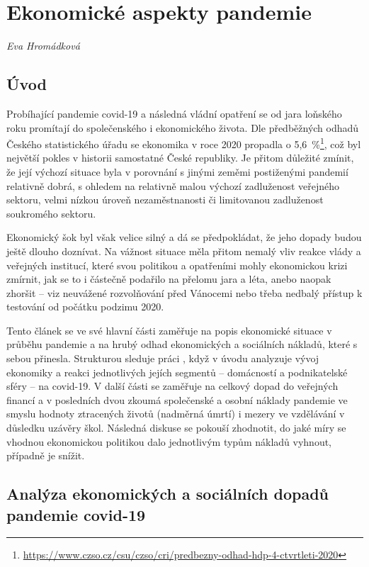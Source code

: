 
\chapter{Ekonomické aspekty pandemie}\label{Ekonomicke_aspekty}

\textit{Eva Hromádková}
\vspace{15mm}

\section*{Úvod} 
Probíhající pandemie covid-19 a následná vládní opatření se od jara loňského roku promítají do společenského i ekonomického života. Dle předběžných odhadů Českého statistického úřadu se ekonomika v roce 2020 propadla o 5,6~\%\footnote{\url{https://www.czso.cz/csu/czso/cri/predbezny-odhad-hdp-4-ctvrtleti-2020}}, což byl největší pokles v historii samostatné České republiky. Je přitom důležité zmínit, že její výchozí situace byla v porovnání s jinými zeměmi postiženými pandemií relativně dobrá, s ohledem na relativně malou výchozí zadluženost veřejného sektoru, velmi nízkou úroveň nezaměstnanosti či limitovanou zadluženost soukromého sektoru. 

Ekonomický šok byl však velice silný a dá se předpokládat, že jeho dopady budou ještě dlouho doznívat. Na vážnost situace měla přitom nemalý vliv reakce vlády a veřejných institucí, které svou politikou a opatřeními mohly ekonomickou krizi zmírnit, jak se to i částečně podařilo na přelomu jara a léta, anebo naopak zhoršit -- viz neuvážené rozvolňování před Vánocemi nebo třeba nedbalý přístup k testování od počátku podzimu 2020.

Tento článek se ve své hlavní části zaměřuje na popis ekonomické situace v průběhu pandemie a na hrubý odhad ekonomických a sociálních nákladů, které s sebou přinesla. Strukturou sleduje práci \cite{Levy2021}, když v úvodu analyzuje vývoj ekonomiky a reakci jednotlivých jejích segmentů – domácností a podnikatelské sféry – na covid-19. V další části se zaměřuje na celkový dopad do veřejných financí a v posledních dvou zkoumá společenské a osobní náklady pandemie ve smyslu hodnoty ztracených životů (nadměrná úmrtí) i mezery ve vzdělávání v důsledku uzávěry škol. Následná diskuse se pokouší zhodnotit, do jaké míry se vhodnou ekonomickou politikou dalo jednotlivým typům nákladů vyhnout, případně je snížit.

\section*{Analýza ekonomických a sociálních dopadů pandemie covid-19} 

